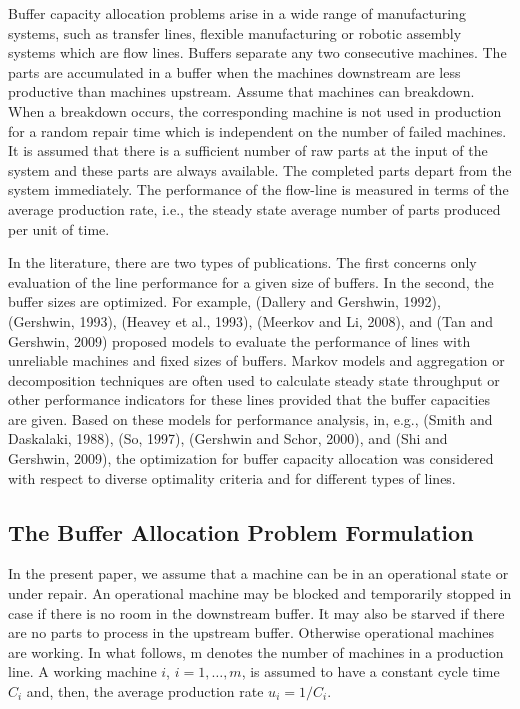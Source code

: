 \documentclass{ifacconf}
\begin{document}
Buffer  capacity  allocation  problems  arise  in  a  wide  range  of  manufacturing  systems, 
such  as  transfer  lines,  flexible  manufacturing  or  robotic  assembly  systems  which  are 
flow lines. Buffers separate any two consecutive machines. The parts are accumulated in
a buffer when the machines downstream are less productive than machines upstream. 
Assume that machines can breakdown. When a breakdown occurs, the corresponding 
machine is not used in production for a random repair time which is independent on the 
number of failed machines. It is assumed that there is a sufficient number of raw parts at 
the input of the system and these parts are always available. The completed parts depart 
from the system immediately. The performance of the flow-line is measured in terms of 
the average production rate, i.e., the steady state average number of parts produced per 
unit of time.

In the literature, there are two types of publications. The first concerns only evaluation 
of the line performance for a given size of buffers. In the second, the buffer sizes are 
optimized. For example, (Dallery and Gershwin, 1992), (Gershwin, 1993), (Heavey et 
al., 1993), (Meerkov and Li, 2008), and (Tan and Gershwin, 2009) proposed models to 
evaluate the performance of lines with unreliable machines and fixed sizes of buffers. 
Markov models and aggregation or decomposition techniques are often used to calculate 
steady state throughput or other performance indicators for these lines provided that the 
buffer  capacities  are  given.  Based  on  these  models  for  performance  analysis,  in,  e.g., 
(Smith  and  Daskalaki,  1988),  (So,  1997),  (Gershwin  and  Schor,  2000),  and  (Shi  and 
Gershwin,  2009),  the  optimization  for  buffer  capacity  allocation  was  considered  with 
respect to diverse optimality criteria and for different types of lines.

\subsection{The Buffer Allocation Problem Formulation} \label{bap_formulation}

In the present paper, we assume that a machine can be in an operational state or under 
repair. An operational machine may be blocked and temporarily stopped in case if there 
is  no  room  in  the  downstream  buffer.  It  may  also  be  starved  if  there  are  no  parts  to 
process  in  the  upstream  buffer. Otherwise operational machines are working. In what 
follows, m denotes the number of machines in a production line. A working machine $i$, 
$i=1,…,m$, is assumed to have a constant cycle time $C_i$ and, then, the average production 
rate $u_i=1/C_i$. 
\end{document}
